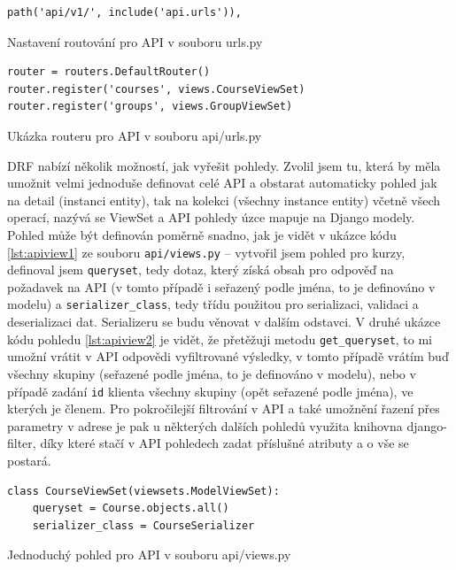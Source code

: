     \begin{listing}[ht]
    	\begin{verbatim}
path('api/v1/', include('api.urls')),
    	\end{verbatim}
    	\caption{Nastavení routování pro API v souboru urls.py}\label{lst:urls.py2}
    \end{listing}
    
    \begin{listing}[ht]
    	\begin{verbatim}
router = routers.DefaultRouter()
router.register('courses', views.CourseViewSet)
router.register('groups', views.GroupViewSet)
    	\end{verbatim}
    	\caption{Ukázka routeru pro API v souboru api/urls.py}\label{lst:apirouter}
    \end{listing}
    
    DRF nabízí několik možností, jak vyřešit pohledy. Zvolil jsem tu, která by měla umožnit velmi jednoduše definovat celé API a obstarat automaticky pohled jak na detail (instanci entity), tak na kolekci (všechny instance entity) včetně všech operací, nazývá se ViewSet a API pohledy úzce mapuje na Django modely. Pohled může být definován poměrně snadno, jak je vidět v ukázce kódu \ref{lst:apiview1} ze souboru \verb|api/views.py| -- vytvořil jsem pohled pro kurzy, definoval jsem \verb|queryset|, tedy dotaz, který získá obsah pro odpověď na požadavek na API (v tomto případě i seřazený podle jména, to je definováno v modelu) a \verb|serializer_class|, tedy třídu použitou pro serializaci, validaci a deserializaci dat. Serializeru se budu věnovat v dalším odstavci. V druhé ukázce kódu pohledu \ref{lst:apiview2} je vidět, že přetěžuji metodu \verb|get_queryset|, to mi umožní vrátit v API odpovědi vyfiltrované výsledky, v tomto případě vrátím buď všechny skupiny (seřazené podle jména, to je definováno v modelu), nebo v případě zadání \verb|id| klienta všechny skupiny (opět seřazené podle jména), ve kterých je členem. Pro pokročilejší filtrování v API a také umožnění řazení přes parametry v adrese je pak u některých dalších pohledů využita knihovna django-filter, díky které stačí v API pohledech zadat příslušné atributy a o vše se postará.
    
    \begin{listing}[ht]
    	\begin{verbatim}
class CourseViewSet(viewsets.ModelViewSet):
    queryset = Course.objects.all()
    serializer_class = CourseSerializer
    	\end{verbatim}
    	\caption{Jednoduchý pohled pro API v souboru api/views.py}\label{lst:apiview1}
    \end{listing}
    
